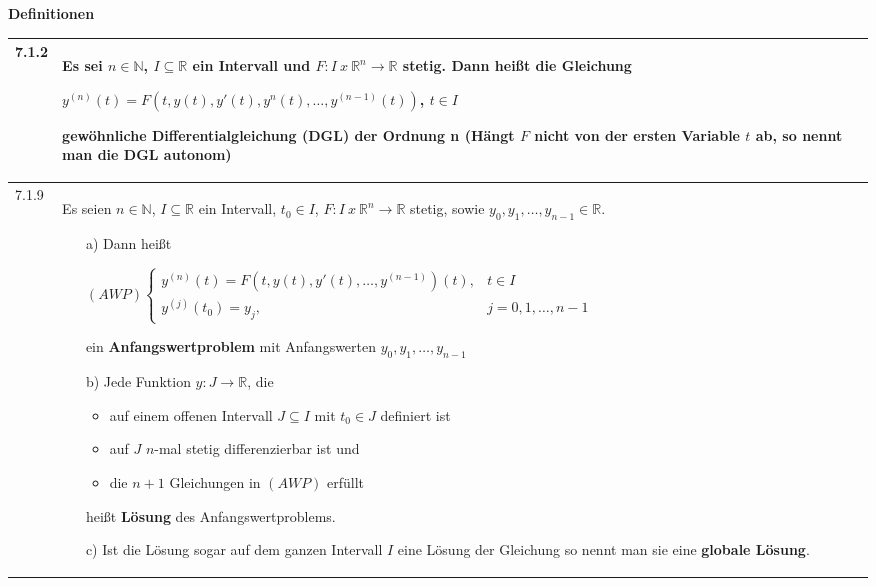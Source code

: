     \noindent
    \textbf{Definitionen}
    \begin{table}[H]  
    \begin{tabularx}{\textwidth}{X m{16cm}}
        \toprule

        7.1.2 & Es sei $n \in \mathbb{N}$, $I \subseteq \mathbb{R}$ ein Intervall und $F: I~x~\mathbb{R}^n \rightarrow \mathbb{R}$ stetig.
                Dann heißt die Gleichung \hfill \break
                \centerline{$ y^{(n)}(t) = F(t,y(t), y'(t), y^n(t), \dots, y^{(n-1)}(t))$, $t\in I$} 
                \textbf{gewöhnliche Differentialgleichung (DGL) der Ordnung n} \hfill \break
                (Hängt $F$ nicht von der ersten Variable $t$ ab, so nennt man die DGL \textbf{autonom}) \\
        \midrule
        7.1.9 & Es seien $n \in \mathbb{N}$, $I \subseteq \mathbb{R}$ ein Intervall, $t_0 \in I$, $F:I ~x~ \mathbb{R}^n \rightarrow \mathbb{R}$
                stetig, sowie $y_0, y_1, \dots, y_{n-1} \in \mathbb{R}$.
                \begin{itemize}[topsep=-0.5cm]
                    \item[a)] Dann heißt \hfill \break
                                \centerline{$ (AWP) \begin{cases}
                                                    y^{(n)}(t) = F(t,y(t),y'(t), \dots, y^{(n-1)})(t), & t \in I \\
                                                    y^{(j)}(t_0) = y_j, & j = 0,1,\dots, n-1
                                                    \end{cases} $}
                                ein \textbf{Anfangswertproblem} mit Anfangswerten $y_0,y_1, \dots, y_{n-1}$ 
                    \item[b)] Jede Funktion $y: J \rightarrow \mathbb{R}$, die 
                                \begin{itemize}
                                    \item auf einem offenen Intervall $J \subseteq I$ mit $t_0 \in J$ definiert ist
                                    \item auf $J$ $n$-mal stetig differenzierbar ist und
                                    \item die $n+1$ Gleichungen in $(AWP)$ erfüllt
                                \end{itemize}
                              heißt \textbf{Lösung} des Anfangswertproblems.
                    \item[c)] Ist die Lösung sogar auf dem ganzen Intervall $I$ eine Lösung der Gleichung so nennt man sie eine
                                \textbf{globale Lösung}.
                \end{itemize} \vspace{-0cm} \\

        \bottomrule

    \end{tabularx}
    \end{table}


